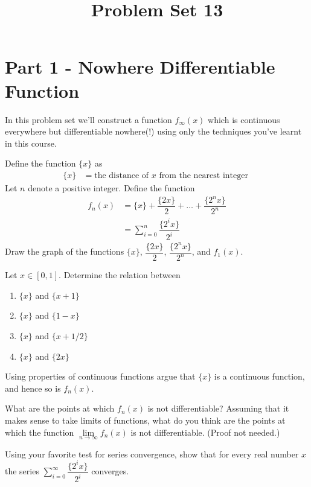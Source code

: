 \documentclass[9pt, a4paper, oneside, reqno]{amsart}
\title{Problem Set 13}
\begin{document}
\maketitle
\thispagestyle{fancy}


\section*{Part 1 - Nowhere Differentiable Function}
In this problem set we'll construct a function $ f_\infty(x)$ which is continuous everywhere but differentiable nowhere(!) using only the techniques you've learnt in this course.


\begin{questions}
	\item
	Define the function $ \{ x \}$ as
	\begin{align*}
		\{x \} & = \mbox{the distance of $x$ from the nearest integer }
	\end{align*}
	Let $ n$ denote a positive integer. Define the function
	\begin{align*}
		f_n(x)
		 & =  \{x\} + \dfrac{\{ 2 x\}}{2} + \dots + \dfrac{\{ 2^n x\}}{2^{n}} \\
		 & = \sum \limits_{i=0}^{n} \dfrac{\{ 2^i x\}}{2^{i}}
	\end{align*}
 Draw the graph of the functions $ \{x\}$, $ \dfrac{\{ 2 x\}}{2}$, $ \dfrac{\{ 2^n x\}}{2^{n}}$, and $ f_1(x)$.


	\item Let $ x \in [0,1]$. Determine the relation between
	\begin{enumerate}
		\item $ \{x\}$ and $ \{x+1\}$
		\item $ \{x\}$ and $ \{1-x\}$
		\item $ \{x\}$ and $ \{x+1/2 \}$
		\item $ \{x\}$ and $ \{2x\}$
	\end{enumerate}

	\item Using properties of continuous functions argue that $ \{ x \}$ is a continuous function, and hence so is $ f_n(x)$.

	\item What are the points at which $ f_n(x)$ is not differentiable? Assuming that it makes sense to take limits of functions, what do you think are the points at which the function $ \lim \limits_{n\rightarrow \infty}f_n(x)$ is not differentiable. (Proof not needed.)

	\item Using your favorite test for series convergence, show that for every real number $ x$ the series $\sum \limits_{i=0}^{\infty} \dfrac{\{ 2^i x\}}{2^{i}}$ converges.
\end{questions}
\end{document}
